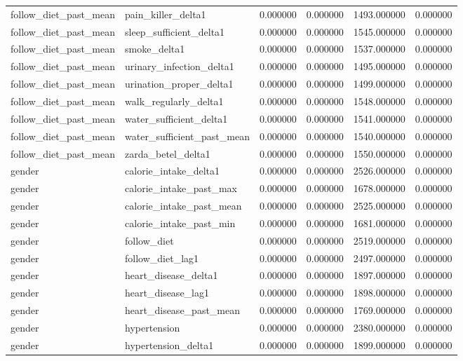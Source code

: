 \begin{longtable}{llrrrr}
follow\_diet\_past\_mean & pain\_killer\_delta1 & 0.000000 & 0.000000 & 1493.000000 & 0.000000 \\
follow\_diet\_past\_mean & sleep\_sufficient\_delta1 & 0.000000 & 0.000000 & 1545.000000 & 0.000000 \\
follow\_diet\_past\_mean & smoke\_delta1 & 0.000000 & 0.000000 & 1537.000000 & 0.000000 \\
follow\_diet\_past\_mean & urinary\_infection\_delta1 & 0.000000 & 0.000000 & 1495.000000 & 0.000000 \\
follow\_diet\_past\_mean & urination\_proper\_delta1 & 0.000000 & 0.000000 & 1499.000000 & 0.000000 \\
follow\_diet\_past\_mean & walk\_regularly\_delta1 & 0.000000 & 0.000000 & 1548.000000 & 0.000000 \\
follow\_diet\_past\_mean & water\_sufficient\_delta1 & 0.000000 & 0.000000 & 1541.000000 & 0.000000 \\
follow\_diet\_past\_mean & water\_sufficient\_past\_mean & 0.000000 & 0.000000 & 1540.000000 & 0.000000 \\
follow\_diet\_past\_mean & zarda\_betel\_delta1 & 0.000000 & 0.000000 & 1550.000000 & 0.000000 \\
gender & calorie\_intake\_delta1 & 0.000000 & 0.000000 & 2526.000000 & 0.000000 \\
gender & calorie\_intake\_past\_max & 0.000000 & 0.000000 & 1678.000000 & 0.000000 \\
gender & calorie\_intake\_past\_mean & 0.000000 & 0.000000 & 2525.000000 & 0.000000 \\
gender & calorie\_intake\_past\_min & 0.000000 & 0.000000 & 1681.000000 & 0.000000 \\
gender & follow\_diet & 0.000000 & 0.000000 & 2519.000000 & 0.000000 \\
gender & follow\_diet\_lag1 & 0.000000 & 0.000000 & 2497.000000 & 0.000000 \\
gender & heart\_disease\_delta1 & 0.000000 & 0.000000 & 1897.000000 & 0.000000 \\
gender & heart\_disease\_lag1 & 0.000000 & 0.000000 & 1898.000000 & 0.000000 \\
gender & heart\_disease\_past\_mean & 0.000000 & 0.000000 & 1769.000000 & 0.000000 \\
gender & hypertension & 0.000000 & 0.000000 & 2380.000000 & 0.000000 \\
gender & hypertension\_delta1 & 0.000000 & 0.000000 & 1899.000000 & 0.000000 \\

\end{longtable}
